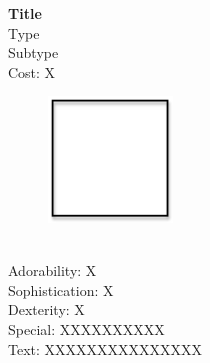 \documentclass{article}
\begin{document}
	\textbf{Title}\\
	Type\\
	Subtype\\
	Cost: X\\
	\begin{figure}
		\vspace{-0.7in}
		\includegraphics[width=1.3in]{square.png}
		\vspace{-1in}
	\end{figure}
	\\[0.75in]
	Adorability: X\\
	Sophistication: X\\
	Dexterity: X\\
	Special: XXXXXXXXXX\\
	\vfill 
	Text: XXXXXXXXXXXXXXX
\end{document}
